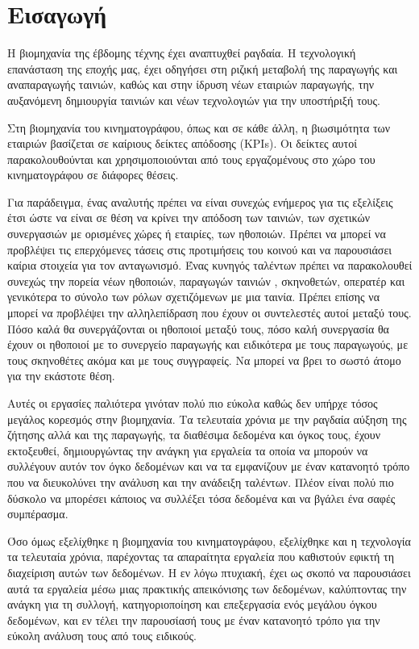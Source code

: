 \chapter{Εισαγωγή}

Η βιομηχανία της έβδομης τέχνης έχει αναπτυχθεί ραγδαία. Η τεχνολογική επανάσταση της εποχής μας, έχει οδηγήσει στη ριζική μεταβολή της παραγωγής και αναπαραγωγής ταινιών, καθώς και στην  ίδρυση νέων εταιριών παραγωγής, την αυξανόμενη δημιουργία ταινιών και νέων τεχνολογιών για την υποστήριξή τους.

Στη βιομηχανία του κινηματογράφου, όπως και σε κάθε άλλη, η βιωσιμότητα των εταιριών βασίζεται σε καίριους δείκτες απόδοσης (KPIs). Οι δείκτες αυτοί παρακολουθούνται και χρησιμοποιούνται από τους εργαζομένους στο χώρο του κινηματογράφου σε διάφορες θέσεις. 

Για παράδειγμα, ένας αναλυτής πρέπει να είναι συνεχώς ενήμερος για τις εξελίξεις έτσι ώστε να είναι σε θέση να κρίνει την απόδοση των ταινιών, των σχετικών συνεργασιών με ορισμένες χώρες ή εταιρίες, των ηθοποιών. Πρέπει να μπορεί να προβλέψει τις επερχόμενες τάσεις στις προτιμήσεις του κοινού και να παρουσιάσει καίρια στοιχεία για τον ανταγωνισμό. Ένας κυνηγός ταλέντων πρέπει να παρακολουθεί συνεχώς την πορεία νέων ηθοποιών, παραγωγών ταινιών , σκηνοθετών, οπερατέρ και γενικότερα το σύνολο των ρόλων σχετιζόμενων με μια ταινία. Πρέπει επίσης να μπορεί να προβλέψει την αλληλεπίδραση που έχουν οι συντελεστές αυτοί μεταξύ τους. Πόσο καλά θα συνεργάζονται οι ηθοποιοί μεταξύ τους, πόσο καλή συνεργασία θα έχουν οι ηθοποιοί με το συνεργείο παραγωγής και ειδικότερα με τους παραγωγούς, με τους σκηνοθέτες ακόμα και με τους συγγραφείς. Να μπορεί να βρει το σωστό άτομο για την εκάστοτε θέση. 

Αυτές οι εργασίες παλιότερα γινόταν πολύ πιο εύκολα καθώς δεν υπήρχε τόσος μεγάλος κορεσμός στην βιομηχανία. Τα τελευταία χρόνια με την ραγδαία αύξηση της ζήτησης αλλά και της παραγωγής, τα διαθέσιμα δεδομένα και όγκος τους, έχουν εκτοξευθεί, δημιουργώντας την ανάγκη για εργαλεία τα οποία να μπορούν να συλλέγουν αυτόν τον όγκο δεδομένων και να τα εμφανίζουν με έναν κατανοητό τρόπο που να διευκολύνει την ανάλυση και την ανάδειξη ταλέντων. Πλέον είναι πολύ πιο δύσκολο να μπορέσει κάποιος να συλλέξει τόσα δεδομένα και να βγάλει ένα σαφές συμπέρασμα. 

Όσο όμως εξελίχθηκε η βιομηχανία του κινηματογράφου, εξελίχθηκε και η τεχνολογία τα τελευταία χρόνια, παρέχοντας τα απαραίτητα εργαλεία που καθιστούν εφικτή τη διαχείριση αυτών των δεδομένων. Η εν λόγω πτυχιακή, έχει ως σκοπό να παρουσιάσει αυτά τα εργαλεία μέσω μιας πρακτικής απεικόνισης των δεδομένων, καλύπτοντας την ανάγκη για τη συλλογή, κατηγοριοποίηση και επεξεργασία ενός μεγάλου όγκου δεδομένων, και εν τέλει την παρουσίασή τους με έναν κατανοητό τρόπο για την εύκολη ανάλυση τους από τους ειδικούς. 


